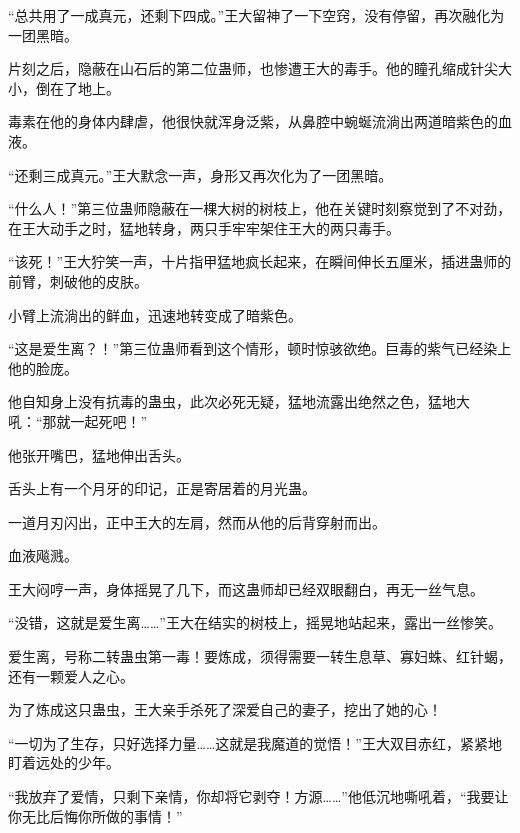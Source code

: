 \begin{this_body}
“总共用了一成真元，还剩下四成。”王大留神了一下空窍，没有停留，再次融化为一团黑暗。

片刻之后，隐蔽在山石后的第二位蛊师，也惨遭王大的毒手。他的瞳孔缩成针尖大小，倒在了地上。

毒素在他的身体内肆虐，他很快就浑身泛紫，从鼻腔中蜿蜒流淌出两道暗紫色的血液。

“还剩三成真元。”王大默念一声，身形又再次化为了一团黑暗。

“什么人！”第三位蛊师隐蔽在一棵大树的树枝上，他在关键时刻察觉到了不对劲，在王大动手之时，猛地转身，两只手牢牢架住王大的两只毒手。

“该死！”王大狞笑一声，十片指甲猛地疯长起来，在瞬间伸长五厘米，插进蛊师的前臂，刺破他的皮肤。

小臂上流淌出的鲜血，迅速地转变成了暗紫色。

“这是爱生离？！”第三位蛊师看到这个情形，顿时惊骇欲绝。巨毒的紫气已经染上他的脸庞。

他自知身上没有抗毒的蛊虫，此次必死无疑，猛地流露出绝然之色，猛地大吼：“那就一起死吧！”

他张开嘴巴，猛地伸出舌头。

舌头上有一个月牙的印记，正是寄居着的月光蛊。

一道月刃闪出，正中王大的左肩，然而从他的后背穿射而出。

血液飚溅。

王大闷哼一声，身体摇晃了几下，而这蛊师却已经双眼翻白，再无一丝气息。

“没错，这就是爱生离……”王大在结实的树枝上，摇晃地站起来，露出一丝惨笑。

爱生离，号称二转蛊虫第一毒！要炼成，须得需要一转生息草、寡妇蛛、红针蝎，还有一颗爱人之心。

为了炼成这只蛊虫，王大亲手杀死了深爱自己的妻子，挖出了她的心！

“一切为了生存，只好选择力量……这就是我魔道的觉悟！”王大双目赤红，紧紧地盯着远处的少年。

“我放弃了爱情，只剩下亲情，你却将它剥夺！方源……”他低沉地嘶吼着，“我要让你无比后悔你所做的事情！”

\end{this_body}

